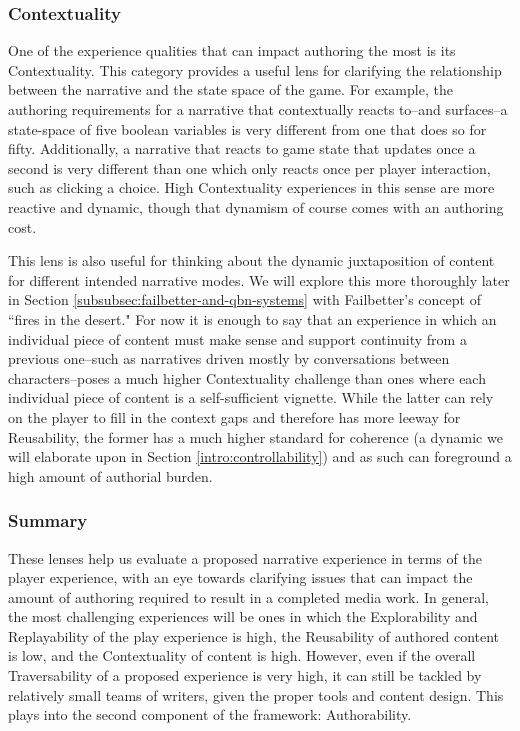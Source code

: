 \subsubsection{Contextuality}

One of the experience qualities that can impact authoring the most is its Contextuality. This category provides a useful lens for clarifying the relationship between the narrative and the state space of the game. For example, the authoring requirements for a narrative that contextually reacts to--and surfaces--a state-space of five boolean variables is very different from one that does so for fifty. Additionally, a narrative that reacts to game state that updates once a second is very different than one which only reacts once per player interaction, such as clicking a choice. High Contextuality experiences in this sense are more reactive and dynamic, though that dynamism of course comes with an authoring cost.

This lens is also useful for thinking about the dynamic juxtaposition of content for different intended narrative modes. We will explore this more thoroughly later in Section \ref{subsubsec:failbetter-and-qbn-systems} with Failbetter's concept of ``fires in the desert." For now it is enough to say that an experience in which an individual piece of content must make sense and support continuity from a previous one--such as narratives driven mostly by conversations between characters--poses a much higher Contextuality challenge than ones where each individual piece of content is a self-sufficient vignette. While the latter can rely on the player to fill in the context gaps and therefore has more leeway for Reusability, the former has a much higher standard for coherence (a dynamic we will elaborate upon in Section \ref{intro:controllability}) and as such can foreground a high amount of authorial burden.

\subsubsection{Summary}

These lenses help us evaluate a proposed narrative experience in terms of the player experience, with an eye towards clarifying issues that can impact the amount of authoring required to result in a completed media work. In general, the most challenging experiences will be ones in which the Explorability and Replayability of the play experience is high, the Reusability of authored content is low, and the Contextuality of content is high. However, even if the overall Traversability of a proposed experience is very high, it can still be tackled by relatively small teams of writers, given the proper tools and content design. This plays into the second component of the framework: Authorability.

